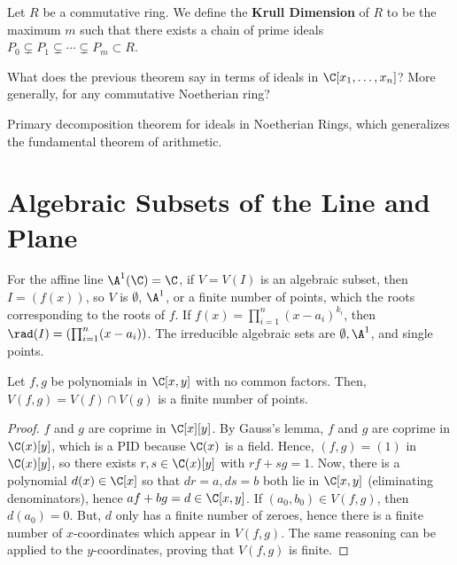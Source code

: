 \begin{defn}
    Let $R$ be a commutative ring. We define the \textbf{Krull Dimension} of $R$ to be the maximum $m$ such that there exists a chain of prime ideals $P_0 \subsetneq P_1 \subsetneq \cdots \subsetneq P_m \subset R$.
\end{defn}

\begin{notebox*}
    What does the previous theorem say in terms of ideals in $\C[x_1,\dots,x_n]$? More generally, for any commutative Noetherian ring?
\end{notebox*}

\begin{notebox*}
    Primary decomposition theorem for ideals in Noetherian Rings, which generalizes the fundamental theorem of arithmetic.
\end{notebox*}

\section{Algebraic Subsets of the Line and Plane}

For the affine line $\A^1(\C) = \C$, if $V = V(I)$ is an algebraic subset, then $I = (f(x))$, so $V$ is $\emptyset$, $\A^1$, or a finite number of points, which the roots corresponding to the roots of $f$. If $f(x) = \prod_{i=1}^n (x-a_i)^{k_i}$, then $\rad (I) = (\prod_{i=1}^n (x-a_i))$. The irreducible algebraic sets are $\emptyset, \A^1$, and single points.

\begin{prop}
    Let $f,g$ be polynomials in $\C[x,y]$ with no common factors. Then, $V(f,g)=V(f) \cap V(g)$ is a finite number of points.
\end{prop}

\begin{proof}
    $f$ and $g$ are coprime in $\C[x][y]$. By Gauss's lemma, $f$ and $g$ are coprime in $\C(x)[y]$, which is a PID because $\C(x)$ is a field. Hence, $(f,g)=(1)$ in $\C(x)[y]$, so there exists $r,s\in \C(x)[y]$ with $rf+sg=1$. Now, there is a polynomial $d(x) \in \C[x]$ so that $dr=a,ds=b$ both lie in $\C[x,y]$ (eliminating denominators), hence $af+bg=d \in \C[x,y]$. If $(a_0,b_0) \in V(f,g)$, then $d(a_0)=0$. But, $d$ only has a finite number of zeroes, hence there is a finite number of $x$-coordinates which appear in $V(f,g)$. The same reasoning can be applied to the $y$-coordinates, proving that $V(f,g)$ is finite.
\end{proof}

